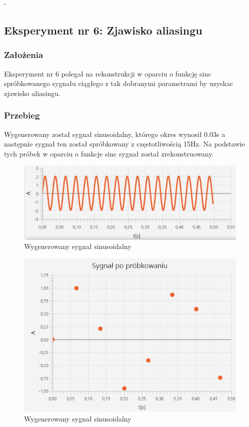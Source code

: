 \documentclass[12pt]{article}
\begin{document}
-\subsection{Eksperyment nr 6: Zjawisko aliasingu }
\subsubsection{Założenia}
Eksperyment nr 6 polegał na rekonstrukcji w oparciu o funkcję sinc spróbkowanego sygnału ciągłego z tak dobranymi parametrami by uzyskac zjawisko aliasingu.
\subsubsection{Przebieg}
Wygenerowany został sygnał sinusoidalny, którego okres wynosił 0.03s a następnie sygnał ten został spróbkowany z częstotliwością 15Hz. Na podstawie tych próbek w oparciu o funkcje sinc sygnał został zrekonstruowany.
\begin{figure}[H]
	\centering
	\includegraphics{cps_aliasing_wejsciowy.jpg}
	\caption{Wygenerowany sygnał sinusoidalny}
	\label{sygnał wejściowy dla eksperymentu 6}
\end{figure}
\begin{figure}[H]
	\centering
	\includegraphics{cps_aliasing_probki.jpg}
	\caption{Wygenerowany sygnał sinusoidalny}
	\label{spróbkowany sygnał dla eksperymentu 6}
\end{figure}
\end{document}
